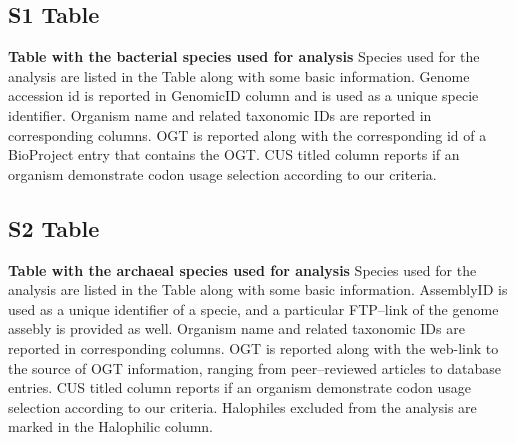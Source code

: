 \documentclass[10pt,letterpaper]{article}
\begin{document}

\subsection*{S1 Table}
\label{table:s1}
{\bf Table with the bacterial species used for analysis}
Species used for the analysis are listed in the Table along with some basic information.
Genome accession id is reported in GenomicID column and is used as a unique specie identifier.
Organism name and related taxonomic IDs are reported in corresponding columns.
OGT is reported along with the corresponding id of a BioProject entry that contains the OGT.
CUS titled column reports if an organism demonstrate codon usage selection according to our criteria.


\subsection*{S2 Table}
\label{table:s2}
{\bf Table with the archaeal species used for analysis}
Species used for the analysis are listed in the Table along with some basic information.
AssemblyID is used as a unique identifier of a specie, and a particular FTP--link of the genome assebly is provided as well.
Organism name and related taxonomic IDs are reported in corresponding columns. OGT is reported along with the web-link to the source of OGT information, ranging from peer--reviewed articles to database entries. CUS titled column reports if an organism demonstrate codon usage selection according to our criteria. Halophiles excluded from the analysis are marked in the Halophilic column.



\end{document}
